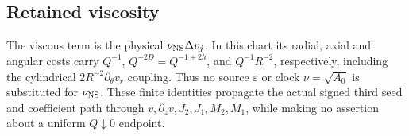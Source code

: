 \documentclass[11pt]{article}
\begin{document}
\subsection{Retained viscosity}
The viscous term is the physical \(\nu_{\rm NS}\Delta v_j\).  In this chart
its radial, axial and angular costs carry \(Q^{-1}\), \(Q^{-2D}=Q^{-1+2h}\),
and \(Q^{-1}R^{-2}\), respectively, including the cylindrical
\(2R^{-2}\partial_\theta v_r\) coupling.  Thus no source \(\varepsilon\)
or clock \(\nu=\sqrt{A_0}\) is substituted for \(\nu_{\rm NS}\).  These
finite identities propagate the actual signed third seed and coefficient
path through \(v,\partial_zv,J_2,J_1,M_2,M_1\), while making no assertion
about a uniform \(Q\downarrow0\) endpoint.
\label{qext:conclusion}
\end{document}
